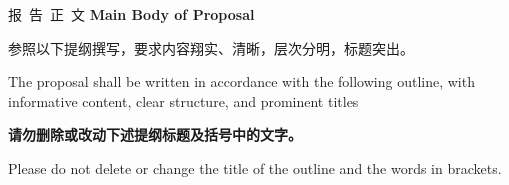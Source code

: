 {\sanhao 报\ 告\ 正\ 文 \bfseries {} Main Body of Proposal}

{\sihao \kaishu  
参照以下提纲撰写，要求内容翔实、清晰，层次分明，标题突出。}

{\sihao {} The proposal shall be written in accordance 
with the following outline, with informative content, clear structure, 
and prominent titles}

{\sihao \kaishu \color{MsBlue} \bfseries 请勿删除或改动下述提纲标题及括号中的文字。}

{\sihao \color{MsBlue}  Please do not delete or 
change the title of the outline and the words in brackets.}

\vskip -5mm